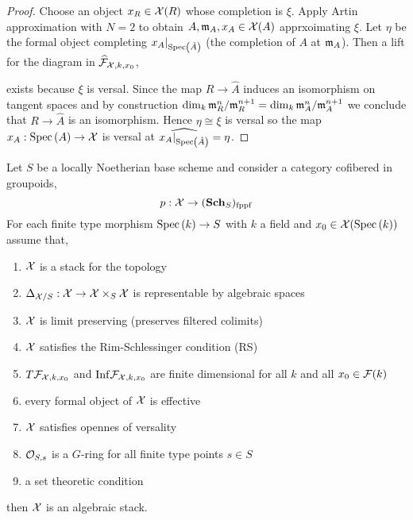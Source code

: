 \documentclass[12pt]{article}
\begin{document}
\begin{proof}
Choose an object $x_R \in \mathcal{X}(R)$ whose completion is $\xi$. Apply Artin approximation with $N = 2$ to obtain $A, \mathfrak{m}_A, x_A \in \mathcal{X}(A)$ apprxoimating $\xi$. Let $\eta$ be the formal object completing $x_A |_{\mathrm{Spec}\left( \hat{A} \right)}$ (the completion of $A$ at $\mathfrak{m}_A$). Then a lift for the diagram in $\widehat{\mathcal{F}}_{\mathcal{X}, k, x_0}$,
\begin{center}
\quad {} \quad
{}
\end{center}
exists because $\xi$ is versal. Since the map $R \to \hat{A}$ induces an isomorphism on tangent spaces and by construction $\dim_k \mathfrak{m}_R^n / \mathfrak{m}_R^{n+1} = \dim_k \mathfrak{m}_A^n / \mathfrak{m}_A^{n+1}$ we conclude that $R \to \hat{A}$ is an isomorphism. Hence $\eta \cong \xi$ is versal so the map $x_A : \mathrm{Spec}\left( A \right) \to \mathcal{X}$ is versal at $\widehat{x_A|_{\mathrm{Spec}\left( \hat{A} \right)}}  = \eta$. 
\end{proof}

\begin{theorem}
Let $S$ be a locally Noetherian base scheme and consider a category cofibered in groupoids,
\[ p : \mathcal{X} \to (\mathbf{Sch}_S)_{\mathrm{fppf}} \]
For each finite type morphism $\mathrm{Spec}\left( k \right) \to S$ with $k$ a field and $x_0 \in \mathcal{X}(\mathrm{Spec}\left( k \right))$  assume that,
\begin{enumerate}
\item $\mathcal{X}$ is a stack for the \etale topology
\item $\Delta_{\mathcal{X} / S} : \mathcal{X} \to \mathcal{X} \times_S \mathcal{X}$ is representable by algebraic spaces
\item $\mathcal{X}$ is limit preserving (preserves filtered colimits)
\item $\mathcal{X}$ satisfies the Rim-Schlessinger condition (RS)
\item $T \mathcal{F}_{\mathcal{X}, k, x_0}$ and $\mathrm{Inf}{\mathcal{F}_{\mathcal{X}, k, x_0}}$ are finite dimensional for all $k$ and all $x_0 \in \mathcal{F}(k)$
\item every formal object of $\mathcal{X}$ is effective
\item $\mathcal{X}$ satisfies opennes of versality
\item $\mathcal{O}_{S, s}$ is a $G$-ring for all finite type points $s \in S$ 
\item a set theoretic condition
\end{enumerate}
then $\mathcal{X}$ is an algebraic stack. 
\end{theorem}
\end{document}

